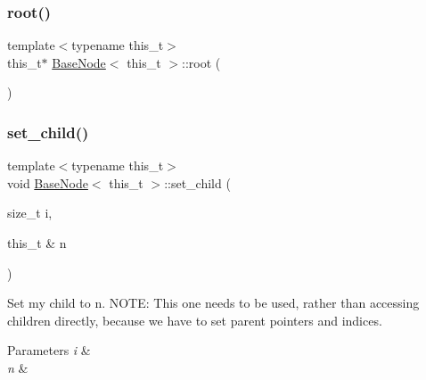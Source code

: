 \mbox{\label{class_base_node_ab953456c09fa01bbf8a29c07f4d2b5ad}} 
\subsubsection{\texorpdfstring{root()}{root()}}
{\footnotesize\ttfamily template$<$typename this\+\_\+t$>$ \\
this\+\_\+t$\ast$ \hyperlink{class_base_node}{Base\+Node}$<$ this\+\_\+t $>$\+::root (\begin{DoxyParamCaption}{ }\end{DoxyParamCaption})\hspace{0.3cm}{\ttfamily [inline]}}

\mbox{\label{class_base_node_a575b94703d0c67ba8c04b6a725b48b56}} 
\subsubsection{\texorpdfstring{set\+\_\+child()}{set\_child()}\hspace{0.1cm}{\footnotesize\ttfamily [1/2]}}
{\footnotesize\ttfamily template$<$typename this\+\_\+t$>$ \\
void \hyperlink{class_base_node}{Base\+Node}$<$ this\+\_\+t $>$\+::set\+\_\+child (\begin{DoxyParamCaption}\item[{size\+\_\+t}]{i,  }\item[{this\+\_\+t \&}]{n }\end{DoxyParamCaption})\hspace{0.3cm}{\ttfamily [inline]}}

Set my child to n. N\+O\+TE\+: This one needs to be used, rather than accessing children directly, because we have to set parent pointers and indices. 
\begin{DoxyParams}{Parameters}
{\em i} & \\
\hline
{\em n} & \\
\hline
\end{DoxyParams}
\mbox{\label{class_base_node_a7c2892c91eb31bc0d72bfb0c57ec8dea}} 
